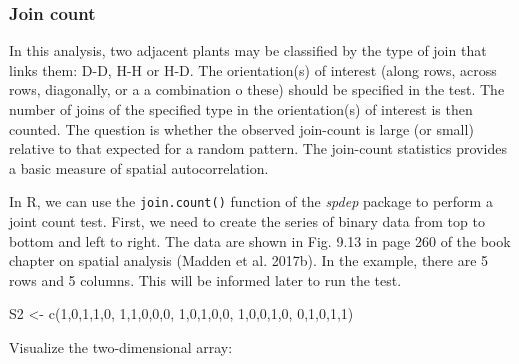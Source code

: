 \documentclass[
  letterpaper,
  DIV=11,
  numbers=noendperiod]{scrreprt}
\newenvironment{Shaded}{\begin{snugshade}}{\end{snugshade}}
\newcommand{\DecValTok}[1]{\textcolor[rgb]{0.68,0.00,0.00}{#1}}
\newcommand{\FunctionTok}[1]{\textcolor[rgb]{0.28,0.35,0.67}{#1}}
\newcommand{\NormalTok}[1]{\textcolor[rgb]{0.00,0.23,0.31}{#1}}
\newcommand{\OtherTok}[1]{\textcolor[rgb]{0.00,0.23,0.31}{#1}}
\begin{document}
\hypertarget{join-count}{%
\subsubsection{Join count}\label{join-count}}

In this analysis, two adjacent plants may be classified by the type of
join that links them: D-D, H-H or H-D. The orientation(s) of interest
(along rows, across rows, diagonally, or a a combination o these) should
be specified in the test. The number of joins of the specified type in
the orientation(s) of interest is then counted. The question is whether
the observed join-count is large (or small) relative to that expected
for a random pattern. The join-count statistics provides a basic measure
of spatial autocorrelation.

In R, we can use the \texttt{join.count()} function of the \emph{spdep}
package to perform a joint count test. First, we need to create the
series of binary data from top to bottom and left to right. The data are
shown in Fig. 9.13 in page 260 of the book chapter on spatial analysis
(Madden et al. 2017b). In the example, there are 5 rows and 5 columns.
This will be informed later to run the test.

\begin{Shaded}
\begin{Highlighting}[]
\NormalTok{S2 }\OtherTok{\textless{}{-}} \FunctionTok{c}\NormalTok{(}\DecValTok{1}\NormalTok{,}\DecValTok{0}\NormalTok{,}\DecValTok{1}\NormalTok{,}\DecValTok{1}\NormalTok{,}\DecValTok{0}\NormalTok{,}
       \DecValTok{1}\NormalTok{,}\DecValTok{1}\NormalTok{,}\DecValTok{0}\NormalTok{,}\DecValTok{0}\NormalTok{,}\DecValTok{0}\NormalTok{,}
       \DecValTok{1}\NormalTok{,}\DecValTok{0}\NormalTok{,}\DecValTok{1}\NormalTok{,}\DecValTok{0}\NormalTok{,}\DecValTok{0}\NormalTok{,}
       \DecValTok{1}\NormalTok{,}\DecValTok{0}\NormalTok{,}\DecValTok{0}\NormalTok{,}\DecValTok{1}\NormalTok{,}\DecValTok{0}\NormalTok{,}
       \DecValTok{0}\NormalTok{,}\DecValTok{1}\NormalTok{,}\DecValTok{0}\NormalTok{,}\DecValTok{1}\NormalTok{,}\DecValTok{1}\NormalTok{)}
\end{Highlighting}
\end{Shaded}

Visualize the two-dimensional array:
\end{document}
